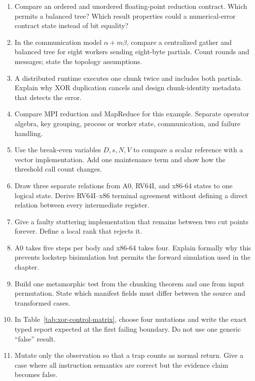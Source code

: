 \begin{enumerate}
\item Compare an ordered and unordered floating-point reduction contract.
Which permits a balanced tree? Which result properties could a numerical-error
contract state instead of bit equality?

\item In the communication model \(\alpha+m\beta\), compare a centralized
gather and balanced tree for eight workers sending eight-byte partials. Count
rounds and messages; state the topology assumptions.

\item A distributed runtime executes one chunk twice and includes both
partials. Explain why XOR duplication cancels and design chunk-identity
metadata that detects the error.

\item Compare MPI reduction and MapReduce for this example. Separate operator
algebra, key grouping, process or worker state, communication, and failure
handling.

\item Use the break-even variables \(D,s,N,V\) to compare a scalar reference
with a vector implementation. Add one maintenance term and show how the
threshold call count changes.

\item Draw three separate relations from A0, RV64I, and x86-64 states to one
logical state. Derive RV64I--x86 terminal agreement without defining a direct
relation between every intermediate register.

\item Give a faulty stuttering implementation that remains between two cut
points forever. Define a local rank that rejects it.

\item A0 takes five steps per body and x86-64 takes four. Explain formally why
this prevents lockstep bisimulation but permits the forward simulation used in
the chapter.

\item Build one metamorphic test from the chunking theorem and one from input
permutation. State which manifest fields must differ between the source and
transformed cases.

\item In Table~\ref{tab:xor-control-matrix}, choose four mutations and write
the exact typed report expected at the first failing boundary. Do not use one
generic ``false'' result.

\item Mutate only the observation so that a trap counts as normal return. Give
a case where all instruction semantics are correct but the evidence claim
becomes false.


\end{enumerate}
